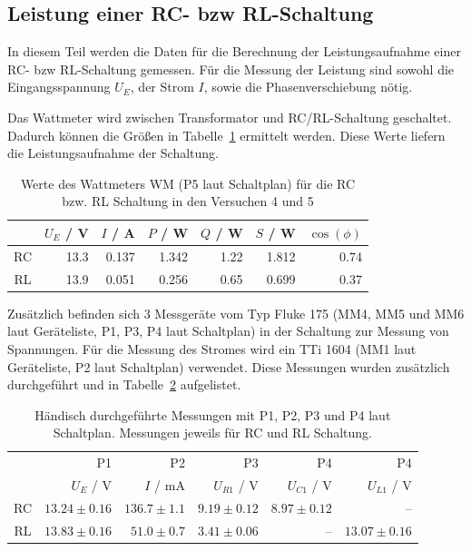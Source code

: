 \documentclass{article}
\begin{document}
\subsection{Leistung einer RC- bzw RL-Schaltung}

In diesem Teil werden die Daten für die Berechnung der Leistungsaufnahme einer RC- bzw RL-Schaltung gemessen. Für die Messung der Leistung sind sowohl die Eingangsspannung $U_E$, der Strom $I$, sowie die Phasenverschiebung nötig.

Das Wattmeter wird zwischen Transformator und RC/RL-Schaltung geschaltet. Dadurch können die Größen in Tabelle~\ref{tab:task45_wattmeter} ermittelt werden. Diese Werte liefern die Leistungsaufnahme der Schaltung. 

\begin{table}[H]
\caption{Werte des Wattmeters WM (P5 laut Schaltplan) für die RC bzw. RL Schaltung in den Versuchen 4 und 5}
\label{tab:task45_wattmeter}

\begin{tabular}{c|rrrrrr}
& $U_E$ / V & $I$ / A & $P$ / W & $Q$ / W & $S$ / W & $\cos(\phi)$ \\
\hline 
RC & 13.3 & 0.137 & 1.342 & 1.22 & 1.812 & 0.74 \\
RL & 13.9 & 0.051 & 0.256 & 0.65 & 0.699 & 0.37
\end{tabular}
\end{table}





Zusätzlich befinden sich 3 Messgeräte vom Typ Fluke 175 (MM4, MM5 und MM6 laut Geräteliste, P1, P3, P4 laut Schaltplan) in der Schaltung zur Messung von Spannungen. Für die Messung des Stromes wird ein TTi 1604 (MM1 laut Geräteliste, P2 laut Schaltplan) verwendet. Diese Messungen wurden zusätzlich durchgeführt und in Tabelle~\ref{tab:task45_messungen} aufgelistet.


\begin{table}[H]
\caption{Händisch durchgeführte Messungen mit P1, P2, P3 und P4 laut Schaltplan. Messungen jeweils für RC und RL Schaltung.}
\label{tab:task45_messungen}

\begin{tabular}{c|rrrrr}
& P1 & P2 & P3 & P4 & P4 \\
& $U_E$ / V & $I$ / mA & $U_{R1}$ / V & $U_{C1}$ / V & $U_{L1}$ / V \\
\hline 
RC & $13.24 \pm 0.16$ & $136.7\pm1.1$ & $9.19 \pm 0.12$ & $8.97 \pm 0.12$ & -- \\
RL & $13.83 \pm 0.16$ & $51.0\pm0.7$ & $3.41 \pm 0.06$ &  -- & $13.07 \pm 0.16$
\end{tabular}
\end{table}
\end{document}
